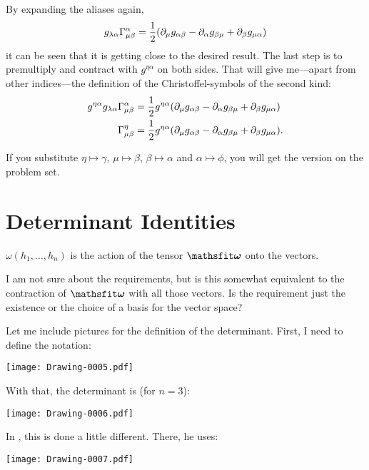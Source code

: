 By expanding the aliases again,
\[
    g_{\lambda\alpha} \Gamma^{\alpha}_{{\mu}{\beta}} = \frac12 (\partial_\mu g_{\alpha\beta} - \partial_\alpha g_{\beta\mu} + \partial_\beta g_{\mu\alpha})
\]
it can be seen that it is getting close to the desired result. The last step is
to premultiply and contract with $g^{\eta\alpha}$ on both sides. That will give
me—apart from other indices—the definition of the Christoffel-symbols of the
second kind:
\begin{align*}
    g^{\eta\alpha} g_{\lambda\alpha} \Gamma^{\alpha}_{{\mu}{\beta}} &= \frac12
    g^{\eta\alpha} (\partial_\mu g_{\alpha\beta} - \partial_\alpha g_{\beta\mu}
    + \partial_\beta g_{\mu\alpha}) \\ 
    \Gamma^{\eta}_{{\mu}{\beta}} &= \frac12
    g^{\eta\alpha} (\partial_\mu g_{\alpha\beta} - \partial_\alpha g_{\beta\mu}
    + \partial_\beta g_{\mu\alpha}).
\end{align*}

If you substitute $\eta\mapsto\gamma$, $\mu\mapsto\beta$, $\beta\mapsto\alpha$
and $\alpha\mapsto\phi$, you will get the version on the problem set.

\section{Determinant Identities}

\begin{aside}
    $\omega(h_1, \ldots, h_n)$ is the action of the tensor $\tens \omega$ onto
    the vectors.

    I am not sure about the requirements, but is this somewhat equivalent to
    the contraction of $\tens \omega$ with all those vectors. Is the
    requirement just the existence or the choice of a basis for the vector
    space?
\end{aside}

Let me include pictures for the definition of the determinant. First, I need to
define the notation:
\begin{center}
    \texttt{[image: Drawing-0005.pdf]}
\end{center}

With that, the determinant is (for $n = 3$):
\begin{center}
    \texttt{[image: Drawing-0006.pdf]}
\end{center}

In \parencite{penrose-road_to_reality}, this is done a little different. There,
he uses:
\begin{center}
    \texttt{[image: Drawing-0007.pdf]}
\end{center}

